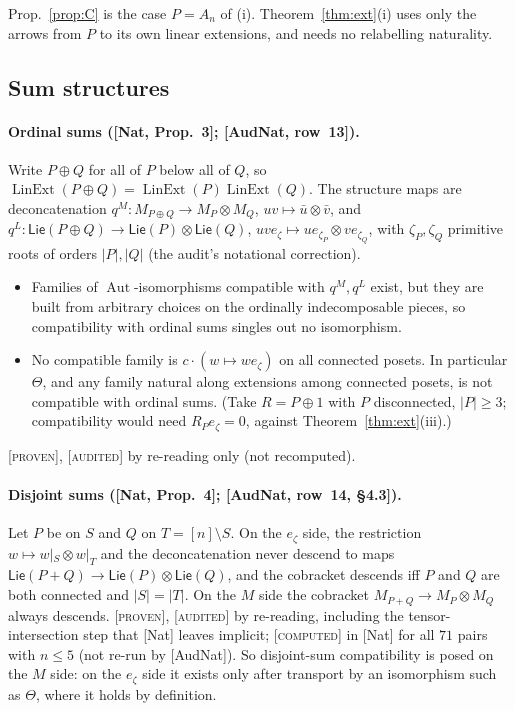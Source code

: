 \documentclass[11pt]{article}
\theoremstyle{definition}
\theoremstyle{remark}
\newcommand{\Lin}{\operatorname{LinExt}}
\newcommand{\Aut}{\operatorname{Aut}}
\newcommand{\PLie}{\mathsf{Lie}}
\newcommand{\st}[1]{\textup{[\textsc{#1}]}}
\begin{document}
Prop.~\ref{prop:C} is the case $P=A_n$ of (i). Theorem~\ref{thm:ext}(i) uses
only the arrows from $P$ to its own linear extensions, and needs no
relabelling naturality.

\subsection{Sum structures}

\paragraph{Ordinal sums ([Nat, Prop.~3]; [AudNat, row~13]).} Write $P\oplus Q$
for all of $P$ below all of $Q$, so $\Lin(P\oplus Q)=\Lin(P)\Lin(Q)$. The
structure maps are deconcatenation $q^M:M_{P\oplus Q}\to M_P\otimes M_Q$,
$uv\mapsto\bar u\otimes\bar v$, and
$q^L:\PLie(P\oplus Q)\to\PLie(P)\otimes\PLie(Q)$,
$uve_\zeta\mapsto ue_{\zeta_P}\otimes ve_{\zeta_Q}$, with $\zeta_P,\zeta_Q$
primitive roots of orders $|P|,|Q|$ (the audit's notational correction).
\begin{itemize}[nosep]
\item Families of $\Aut$-isomorphisms compatible with $q^M,q^L$ exist, but
  they are built from arbitrary choices on the ordinally indecomposable
  pieces, so compatibility with ordinal sums singles out no isomorphism.
\item No compatible family is $c\cdot(w\mapsto we_\zeta)$ on all connected
  posets. In particular $\Theta$, and any family natural along extensions
  among connected posets, is not compatible with ordinal sums. (Take $R=P\oplus1$
  with $P$ disconnected, $|P|\ge3$; compatibility would need
  $R_Pe_\zeta=0$, against Theorem~\ref{thm:ext}(iii).)
\end{itemize}
\st{proven}, \st{audited} by re-reading only (not recomputed).

\paragraph{Disjoint sums ([Nat, Prop.~4]; [AudNat, row~14, \S4.3]).} Let $P$
be on $S$ and $Q$ on $T=[n]\setminus S$. On the $e_\zeta$ side, the
restriction $w\mapsto w|_S\otimes w|_T$ and the deconcatenation never descend
to maps $\PLie(P+Q)\to\PLie(P)\otimes\PLie(Q)$, and the cobracket descends iff
$P$ and $Q$ are both connected and $|S|=|T|$. On the $M$ side the cobracket
$M_{P+Q}\to M_P\otimes M_Q$ always descends. \st{proven}, \st{audited} by
re-reading, including the tensor-intersection step that [Nat] leaves
implicit; \st{computed} in [Nat] for all $71$ pairs with $n\le5$ (not re-run
by [AudNat]). So disjoint-sum compatibility is posed on the $M$ side: on the
$e_\zeta$ side it exists only after transport by an isomorphism such as
$\Theta$, where it holds by definition.
\end{document}
